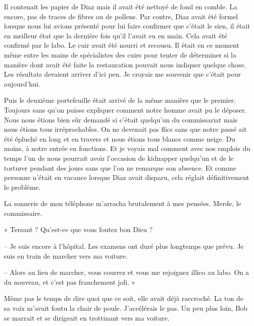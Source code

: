 Il contenait les papier de Diaz mais il avait été nettoyé de fond en comble. La encore, pas de traces de fibres ou de 
pollens. Par contre, Diaz avait été formel lorsque nous lui avions présenté pour lui faire confirmer que c'était le 
sien, il était en meilleur état que la dernière fois qu'il l'avait eu en main. Cela avait été confirmé par le labo. Le 
cuir avait été nourri et recousu. Il était en ce moment même entre les mains de spécialistes des cuirs pour tenter de 
déterminer si la manière dont avait été faite la restauration pouvait nous indiquer quelque chose. Les résultats 
devaient arriver d'ici peu. Je croyais me souvenir que c'était pour aujourd'hui.

Puis le deuxième portefeuille était arrivé de la même manière que le premier. Toujours sans qu'on puisse expliquer 
comment notre homme avait pu le déposer. Nous nous étions bien sûr demandé si c'était quelqu'un du commissariat mais 
nous étions tous irréprochables. On ne devenait pas flics sans que notre passé ait été épluché en long et en travers et 
nous étions tous blancs comme neige. Du moins, à notre entrée en fonctions. Et je voyais mal comment avec nos emplois 
du temps l'un de nous pourrait avoir l'occasion de kidnapper quelqu'un et de le torturer pendant des jours sans que 
l'on ne remarque son absence. Et comme personne n'était en vacance lorsque Diaz avait disparu, cela réglait 
définitivement le problème.

La sonnerie de mon téléphone m'arracha brutalement à mes pensées. Merde, le commissaire.

« Tersant ? Qu'est-ce que vous foutez bon Dieu ?

-- Je suis encore à l'hôpital. Les examens ont duré plus longtemps que prévu. Je suis en train de marcher vers ma 
voiture.

-- Alors au lieu de marcher, vous courrez et vous me rejoignez illico au labo. On a du nouveau, et c'est pas 
franchement joli. »

Même pas le temps de dire quoi que ce soit, elle avait déjà raccroché. La ton de sa voix m'avait foutu la chair de 
poule. J'accélérais le pas. Un peu plus loin, Bob se marrait et se dirigeait en trottinant vers ma voiture.